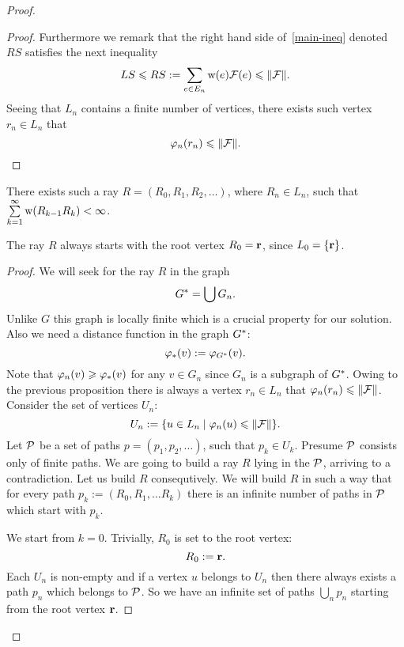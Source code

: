 \documentclass[12pt]{article}
\begin{document}
\begin{proof}
\begin{proof}
        Furthermore we remark that the right hand side of~\eqref{main-ineq} denoted $RS$ satisfies the next inequality
        \[
          LS \leq RS := \sum_{e \in E_n} \wtp(e) \flowpos(e) \leq \|\flowpos\|.
        \]
        Seeing that $L_n$ contains a finite number of vertices, there exists such vertex $r_n \in L_n$ that
        \[
          \phi_n(r_n) \leq \|\flowpos\|.
        \]
      \end{proof}
      \begin{prop}
        There exists such a ray $R=(R_0, R_1, R_2,\dots)$, where $R_n \in L_n$, such that $\sum\limits_{k=1}^\infty \wtp(R_{k-1}R_k) < \infty$.
      \end{prop}
      \begin{note}
        The ray $R$ always starts with the root vertex $R_0 = \root$, since $L_0 = \{\root\}$.
      \end{note}
      \begin{proof}
        We will seek for the ray $R$ in the graph 
        \[
          \gstar = \bigcup G_n.
        \]
        Unlike $G$ this graph is locally finite which is a crucial property for our solution.
        Also we need a distance function in the graph $\gstar$:
        \[
          \phistar(v):=\phi_{\gstar}(v).
        \]
        Note that $\phi_n(v) \geq \phistar(v)$ for any $v \in G_n$ since $G_n$ is a subgraph of $\gstar$.
        Owing to the previous proposition there is always a vertex $r_n \in L_n$ that $\phi_n(r_n) \leq \|\flowpos\|$.
        Consider the set of vertices $U_n$:
        \[
          U_n:= \{u \in L_n \mid \phi_n(u) \leq \|\flowpos\|\}.
        \]
        Let $\cal{P}$ be a set of paths $p = (p_1,p_2, \dots)$, such that $p_k \in U_k$.
        Presume $\cal{P}$ consists only of finite paths.
        We are going to build a ray $R$ lying in the $\cal{P}$, arriving to a contradiction.
        Let us build $R$ consequtively.
        We will build $R$ in such a way that for every path $p_k:= (R_0, R_1, \dots R_k)$ there is an infinite number of paths 
          in $\cal{P}$ which start with $p_k$.
        
        We start from $k = 0$.
        Trivially, $R_0$ is set to the root vertex:
        \[
          R_0 := \root.
        \]
        Each $U_n$ is non-empty and if a vertex $u$ belongs to $U_n$ then there always exists
          a path $p_n$ which belongs to $\cal{P}$.
        So we have an infinite set of paths $\bigcup\limits_n p_n$ starting from the root vertex $\root$.
        

\end{proof}
\end{proof}
\end{document}
